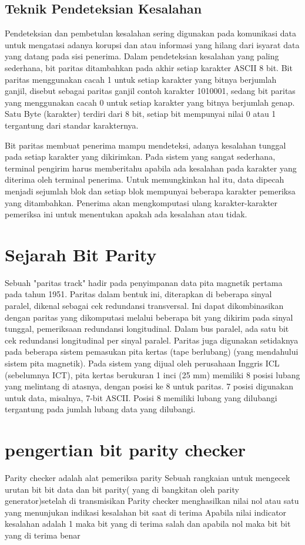 \subsection{Teknik Pendeteksian Kesalahan}
Pendeteksian dan pembetulan kesalahan sering digunakan pada komunikasi data untuk mengatasi adanya korupsi dan atau informasi yang hilang dari isyarat data yang datang pada sisi penerima. Dalam pendeteksian kesalahan yang paling sederhana, bit paritas ditambahkan pada akhir setiap karakter ASCII 8 bit. Bit paritas menggunakan cacah 1 untuk setiap karakter yang bitnya berjumlah ganjil, disebut sebagai paritas ganjil contoh karakter 1010001, sedang bit paritas yang menggunakan cacah 0 untuk setiap karakter yang bitnya berjumlah genap. Satu Byte (karakter) terdiri dari 8 bit, setiap bit mempunyai nilai 0 atau 1 tergantung dari standar karakternya.

Bit paritas membuat penerima mampu mendeteksi, adanya kesalahan tunggal pada setiap karakter yang dikirimkan. Pada sistem yang sangat sederhana, terminal pengirim harus memberitahu apabila ada kesalahan pada karakter yang diterima oleh terminal penerima. Untuk memungkinkan hal itu, data dipecah menjadi sejumlah blok dan setiap blok mempunyai beberapa karakter pemeriksa yang ditambahkan. Penerima akan mengkomputasi ulang karakter-karakter pemeriksa ini untuk menentukan apakah ada kesalahan atau tidak.




\section{Sejarah Bit Parity}
Sebuah "paritas track" hadir pada penyimpanan data pita magnetik pertama pada tahun 1951. Paritas dalam bentuk ini, diterapkan di beberapa sinyal paralel, dikenal sebagai cek redundansi transversal. Ini dapat dikombinasikan dengan paritas yang dikomputasi melalui beberapa bit yang dikirim pada sinyal tunggal, pemeriksaan redundansi longitudinal. Dalam bus paralel, ada satu bit cek redundansi longitudinal per sinyal paralel.
Paritas juga digunakan setidaknya pada beberapa sistem pemasukan pita kertas (tape berlubang) (yang mendahului sistem pita magnetik). Pada sistem yang dijual oleh perusahaan Inggris ICL (sebelumnya ICT), pita kertas berukuran 1 inci (25 mm) memiliki 8 posisi lubang yang melintang di atasnya, dengan posisi ke 8 untuk paritas. 7 posisi digunakan untuk data, misalnya, 7-bit ASCII. Posisi 8 memiliki lubang yang dilubangi tergantung pada jumlah lubang data yang dilubangi.

\section{pengertian bit parity checker}
Parity checker adalah alat pemeriksa parity
Sebuah rangkaian untuk mengecek urutan bit bit data dan bit parity( yang di bangkitan  oleh parity generator)setelah di transmisikan
Parity checker menghasilkan nilai nol atau satu yang menunjukan indikasi kesalahan bit saat di terima
Apabila nilai indicator  kesalahan adalah 1 maka bit yang di terima salah dan apabila nol maka bit bit yang di terima benar

